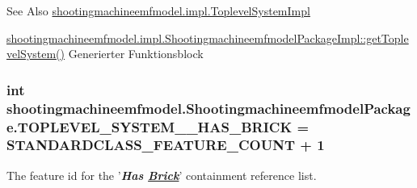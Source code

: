 \begin{DoxySeeAlso}{See Also}
\hyperlink{classshootingmachineemfmodel_1_1impl_1_1_toplevel_system_impl}{shootingmachineemfmodel.\-impl.\-Toplevel\-System\-Impl} 

\hyperlink{classshootingmachineemfmodel_1_1impl_1_1_shootingmachineemfmodel_package_impl_abc4b230ae491dbad8ba7ba99b4ad6a76}{shootingmachineemfmodel.\-impl.\-Shootingmachineemfmodel\-Package\-Impl\-::get\-Toplevel\-System()} Generierter Funktionsblock 
\end{DoxySeeAlso}
\hypertarget{interfaceshootingmachineemfmodel_1_1_shootingmachineemfmodel_package_ad730be94687f37e1a5f006803ca177f8}{
\subsubsection[{T\-O\-P\-L\-E\-V\-E\-L\-\_\-\-S\-Y\-S\-T\-E\-M\-\_\-\-\_\-\-H\-A\-S\-\_\-\-B\-R\-I\-C\-K}]{\setlength{\rightskip}{0pt plus 5cm}int shootingmachineemfmodel.\-Shootingmachineemfmodel\-Package.\-T\-O\-P\-L\-E\-V\-E\-L\-\_\-\-S\-Y\-S\-T\-E\-M\-\_\-\-\_\-\-H\-A\-S\-\_\-\-B\-R\-I\-C\-K = {\bf S\-T\-A\-N\-D\-A\-R\-D\-C\-L\-A\-S\-S\-\_\-\-F\-E\-A\-T\-U\-R\-E\-\_\-\-C\-O\-U\-N\-T} + 1}}\label{interfaceshootingmachineemfmodel_1_1_shootingmachineemfmodel_package_ad730be94687f37e1a5f006803ca177f8}
The feature id for the '{\itshape {\bfseries Has \hyperlink{interfaceshootingmachineemfmodel_1_1_brick}{Brick}}}' containment reference list.

